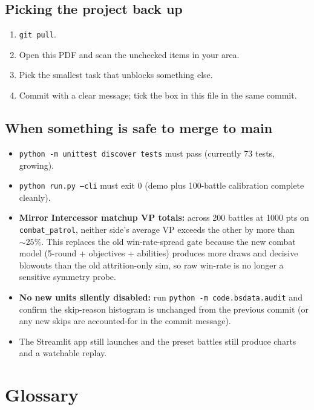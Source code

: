 \documentclass[11pt,a4paper]{article}
\begin{document}
\subsection{Picking the project back up}
\begin{enumerate}[itemsep=2pt]
  \item \texttt{git pull}.
  \item Open this PDF and scan the unchecked items in your area.
  \item Pick the smallest task that unblocks something else.
  \item Commit with a clear message; tick the box in this file in the
    same commit.
\end{enumerate}

\subsection{When something is safe to merge to main}
\begin{itemize}[itemsep=2pt]
  \item \texttt{python -m unittest discover tests} must pass (currently
    73 tests, growing).
  \item \texttt{python run.py --cli} must exit 0 (demo plus 100-battle
    calibration complete cleanly).
  \item \textbf{Mirror Intercessor matchup VP totals:} across 200 battles
    at 1000 pts on \texttt{combat\_patrol}, neither side's average VP
    exceeds the other by more than ${\sim}25\%$. This replaces the old
    win-rate-spread gate because the new combat model (5-round +
    objectives + abilities) produces more draws and decisive blowouts
    than the old attrition-only sim, so raw win-rate is no longer a
    sensitive symmetry probe.
  \item \textbf{No new units silently disabled:} run
    \texttt{python -m code.bsdata.audit} and confirm the skip-reason
    histogram is unchanged from the previous commit (or any new skips
    are accounted-for in the commit message).
  \item The Streamlit app still launches and the preset battles still
    produce charts and a watchable replay.
\end{itemize}

\section{Glossary}
\end{document}
